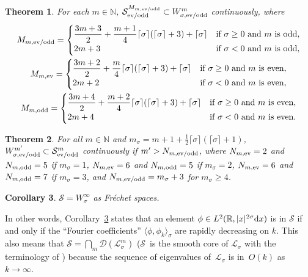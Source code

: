 \documentclass[pdftex]{sigma}
\newtheorem{Theorem}{Theorem}[section]
\newtheorem{Corollary}[Theorem]{Corollary}
\newcommand{\R}{\mathbb{R}}
\newcommand{\N}{\mathbb{N}}
\newcommand{\DD}{\mathcal{D}}
\newcommand{\LL}{\mathcal{L}}
\renewcommand{\SS}{\mathcal{S}}
\begin{document}
\begin{Theorem}\label{t:SS^m' subset W_sigma^m}
  For each $m\in\N$, $\SS_{\text{\rm ev/odd}}^{M_{m,\text{\rm ev/odd}}}\subset W_{\sigma,\text{\rm ev/odd}}^m$ continuously, where
    \begin{gather*}
      M_{m,\text{\rm ev/odd}} =
        \begin{cases}
          \dfrac{3m+3}{2}+\dfrac{m+1}{4} \lceil\sigma\rceil(\lceil\sigma\rceil+3)+\lceil\sigma\rceil & \text{if $\sigma\ge0$ and $m$ is odd},\\
          2m+3 & \text{if $\sigma<0$ and $m$ is odd} ,
        \end{cases}
      \\
      M_{m,\text{\rm ev}} =
        \begin{cases}
          \dfrac{3m+2}{2}+\dfrac{m}{4} \lceil\sigma\rceil(\lceil\sigma\rceil+3)+\lceil\sigma\rceil & \text{if $\sigma\ge0$ and $m$ is even},\\
          2m+2 & \text{if $\sigma<0$ and $m$ is even} ,
        \end{cases}
      \\
      M_{m,\text{\rm odd}} =
        \begin{cases}
          \dfrac{3m+4}{2}+\dfrac{m+2}{4} \lceil\sigma\rceil(\lceil\sigma\rceil+3)+\lceil\sigma\rceil & \text{if $\sigma\ge0$ and $m$ is even},\\
          2m+4 & \text{if $\sigma<0$ and $m$ is even}.
        \end{cases}
    \end{gather*}
\end{Theorem}

\begin{Theorem}\label{t:Sobolev}
  For all $m\in\N$ and $m_\sigma=m+1+\frac{1}{2}\lceil\sigma\rceil(\lceil\sigma\rceil+1)$, $W_{\sigma,\text{\rm ev/odd}}^{m'}\subset\SS_{\text{\rm ev/odd}}^m$ continuously if $m'>N_{m,\text{\rm ev/odd}}$, where $N_{m,\text{\rm ev}}=2$ and $N_{m,\text{\rm odd}}=5$ if $m_\sigma=1$, $N_{m,\text{\rm ev}}=6$ and $N_{m,\text{\rm odd}}=5$ if $m_\sigma=2$, $N_{m,\text{\rm ev}}=6$ and $N_{m,\text{\rm odd}}=7$ if $m_\sigma=3$, and $N_{m,\text{\rm ev/odd}}=m_\sigma+3$ for $m_\sigma\ge4$.
\end{Theorem}

\begin{Corollary}\label{c:SS=W_sigma^infty}
  $\SS=W_\sigma^\infty$ as Fr\'echet spaces.
\end{Corollary}

In other words, Corollary~\ref{c:SS=W_sigma^infty} states that an element $\phi\in L^2(\R,|x|^{2\sigma}{\rm d}x)$ is in $\SS$ if and only if the ``Fourier coef\/f\/icients'' $\langle\phi,\phi_k\rangle_\sigma$ are rapidly decreasing on $k$. This also means that $\SS=\bigcap_m\DD(\LL_\sigma^m)$ ($\SS$~is the smooth core of $\LL_\sigma$ with the terminology of \cite{BruningLesch1992}) because the sequence of eigenvalues of~$\LL_\sigma$ is in~$O(k)$ as~$k\to\infty$.
\end{document}
